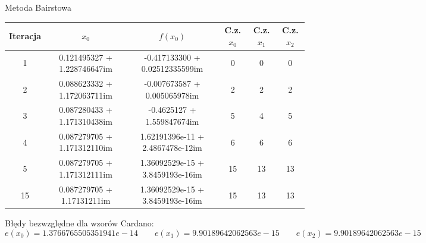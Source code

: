 \documentclass[a4paper]{article}
\begin{document}
    \begin{center}
        Metoda Bairstowa
    \end{center}
    \begin{center}
        \begin{tabular}{|c|c|c|c|c|c|} 
            \hline
            Iteracja & $x_0$ & $f(x_0)$ & C.z. $x_0$ & C.z. $x_1$ & C.z. $x_2$ \\
            \hline
            1 & 0.121495327 + 1.228746647im & -0.417133300 + 0.02512335599im & 0 & 0 & 0 \\ 
            \hline
            2 & 0.088623332 + 1.172063711im & -0.007673587 + 0.005065978im & 2 & 2 & 2 \\ 
            \hline
            3 & 0.087280433 + 1.171310438im & -0.4625127 + 1.559847674im & 5 & 4 & 5 \\
            \hline
            4 & 0.087279705 + 1.171312110im &  1.62191396e-11 + 2.4867478e-12im & 6 & 6 & 6 \\
            \hline
            5 & 0.087279705 + 1.171312111im &  1.36092529e-15 + 3.8459193e-16im & 15 & 13 & 13 \\
            \hline
            15 & 0.087279705 + 1.17131211im &  1.36092529e-15 + 3.8459193e-16im & 15 & 13 & 13 \\
            \hline
        \end{tabular}
    \end{center}

    \vspace{5mm}

    \begin{center}
        Błędy bezwzględne dla wzorów Cardano:
        \[
            e(x_0) = 1.3766765505351941e-14 \qquad e(x_1) = 9.90189642062563e-15 \qquad e(x_2) = 9.90189642062563e-15
        \]
    \end{center}   
\end{document}
